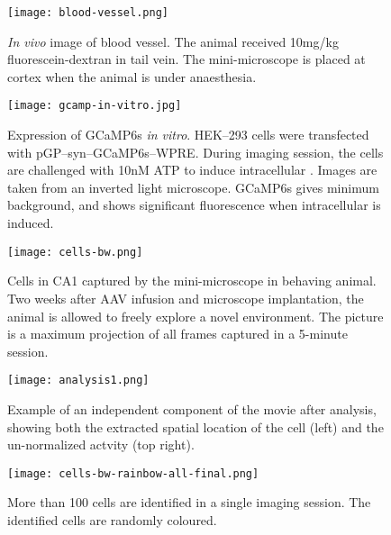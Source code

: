 \begin{figure}[h]
    \texttt{[image: blood-vessel.png]}
    \caption{\textit{In vivo} image of blood vessel. The animal received 10mg/kg fluorescein-dextran in tail vein. The mini-microscope is placed at cortex when the animal is under anaesthesia. \label{f.bloodvessel}}
\end{figure}


\begin{figure}[h]
    \texttt{[image: gcamp-in-vitro.jpg]}
    \caption{Expression of GCaMP6s \textit{in vitro}. HEK--293 cells were transfected with pGP--syn--GCaMP6s--WPRE. During imaging session, the cells are challenged with 10nM ATP to induce intracellular . Images are taken from an inverted light microscope. GCaMP6s gives minimum background, and shows significant fluorescence when intracellular  is induced. \label{f.gcampinvitro}}
\end{figure}


\begin{figure}[h]
    \texttt{[image: cells-bw.png]}
    \caption{Cells in CA1 captured by the mini-microscope in behaving animal. Two weeks after AAV infusion and microscope implantation, the animal is allowed to freely explore a novel environment. The picture is a maximum projection of all frames captured in a 5-minute session. \label{f.ca1bw}}
\end{figure}

\begin{figure}[h]
    \texttt{[image: analysis1.png]}
    \caption{Example of an independent component of the movie after analysis, showing both the extracted spatial location of the cell (left) and the un-normalized actvity (top right). \label{f.analysis}}
\end{figure}


\begin{figure}[h]
    \texttt{[image: cells-bw-rainbow-all-final.png]}
    \caption{More than 100 cells are identified in a single imaging session. The identified cells are randomly coloured. \label{f.ca1rainbow}}
\end{figure}


